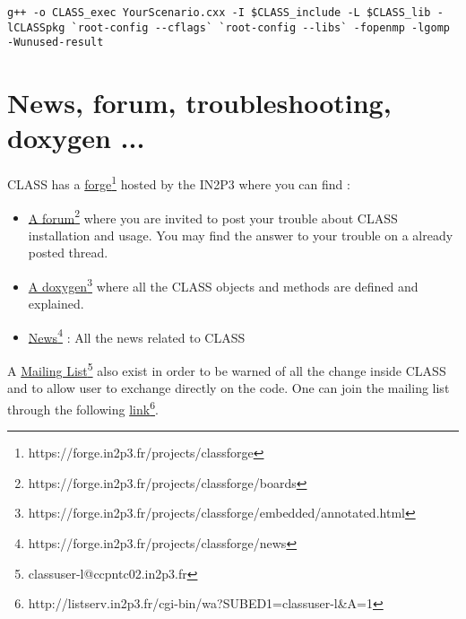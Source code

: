 \begin{center}
\begin{minipage}{\textwidth}
\begin{lstlisting}[style=terminal]
g++ -o CLASS_exec YourScenario.cxx -I $CLASS_include -L $CLASS_lib -lCLASSpkg `root-config --cflags` `root-config --libs` -fopenmp -lgomp -Wunused-result
\end{lstlisting}
\end{minipage}
\end{center}

\chapter{News, forum, troubleshooting, doxygen ...}
CLASS has a \href{https://forge.in2p3.fr/projects/classforge}{forge}\footnote{https://forge.in2p3.fr/projects/classforge} hosted by the IN2P3  where you can find :

\begin{itemize}
\item \href{https://forge.in2p3.fr/projects/classforge/boards}{A forum}\footnote{https://forge.in2p3.fr/projects/classforge/boards} where you are invited to post your trouble about CLASS installation and usage. You may find the answer to your trouble on a already posted thread.
\item \href{https://forge.in2p3.fr/projects/classforge/embedded/annotated.html}{A doxygen}\footnote{https://forge.in2p3.fr/projects/classforge/embedded/annotated.html} where all the CLASS objects and methods are defined and explained.
\item \href{https://forge.in2p3.fr/projects/classforge/news}{News}\footnote{https://forge.in2p3.fr/projects/classforge/news} : All the news related to CLASS
\end{itemize}
A \href{classuser-l@ccpntc02.in2p3.fr}{Mailing List}\footnote{classuser-l@ccpntc02.in2p3.fr} also exist in order to be warned of all the change inside CLASS and to allow user to exchange directly on the code. One can join the mailing list through the following  \href{http://listserv.in2p3.fr/cgi-bin/wa?SUBED1=classuser-l&A=1}{link}\footnote{http://listserv.in2p3.fr/cgi-bin/wa?SUBED1=classuser-l\&A=1}.